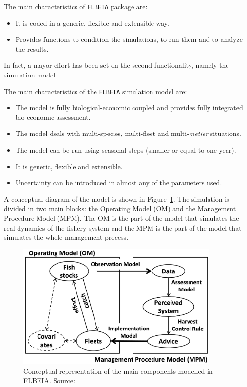 The main characteristics of \texttt{FLBEIA} package are:

\begin{itemize}

	\item	It is coded in a generic, flexible and extensible way.
	\item Provides functions to condition the simulations, to run them and to analyze the results.

\end{itemize}	

In fact, a mayor effort has been set on the second functionality, namely the simulation model.

The main characteristics of the \texttt{FLBEIA} simulation model are:
\begin{itemize}
	
	\item The model is fully biological-economic coupled and provides fully integrated bio-economic assessment.
	\item The model deals with multi-species, multi-fleet and multi-\textit{metier} situations.
	\item The model can be run using seasonal steps (smaller or equal to one year).
	\item	It is generic, flexible and extensible.
  \item Uncertainty can be introduced in almost any of the parameters used.
	
\end{itemize}

A conceptual diagram of the model is  
shown in Figure~\ref{fig:MSE_diagram}. The simulation is divided in two main blocks:
the Operating Model (OM) and the Management Procedure Model (MPM). The OM is the part of the 
model that simulates the real dynamics of the fishery system and the MPM is the part of the model that simulates the whole management process. 

\begin{figure}[ht]
  \centering
    \includegraphics[width= 0.9\textwidth]{MSE_diagram}
  \caption{Conceptual representation of the main components modelled in FLBEIA. Source: \citep{Garcia2013}}
  \label{fig:MSE_diagram}
\end{figure}

